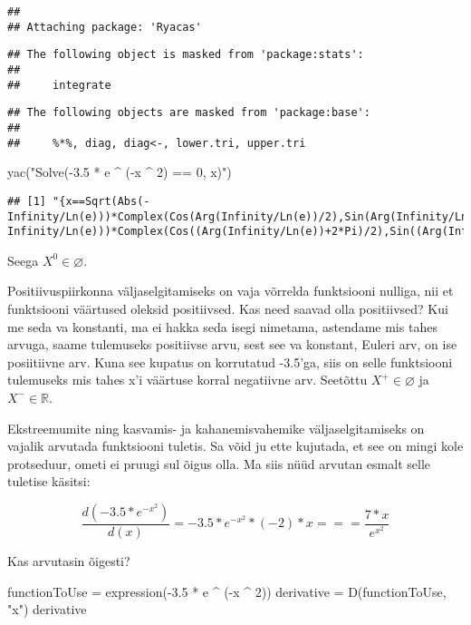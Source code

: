 \documentclass[
]{article}
\newenvironment{Shaded}{\begin{snugshade}}{\end{snugshade}}
\newcommand{\DecValTok}[1]{\textcolor[rgb]{0.00,0.00,0.81}{#1}}
\newcommand{\FloatTok}[1]{\textcolor[rgb]{0.00,0.00,0.81}{#1}}
\newcommand{\FunctionTok}[1]{\textcolor[rgb]{0.00,0.00,0.00}{#1}}
\newcommand{\NormalTok}[1]{#1}
\newcommand{\OtherTok}[1]{\textcolor[rgb]{0.56,0.35,0.01}{#1}}
\newcommand{\SpecialCharTok}[1]{\textcolor[rgb]{0.00,0.00,0.00}{#1}}
\newcommand{\StringTok}[1]{\textcolor[rgb]{0.31,0.60,0.02}{#1}}
\begin{document}
\begin{verbatim}
## 
## Attaching package: 'Ryacas'
\end{verbatim}

\begin{verbatim}
## The following object is masked from 'package:stats':
## 
##     integrate
\end{verbatim}

\begin{verbatim}
## The following objects are masked from 'package:base':
## 
##     %*%, diag, diag<-, lower.tri, upper.tri
\end{verbatim}

\begin{Shaded}
\begin{Highlighting}[]
\FunctionTok{yac}\NormalTok{(}\StringTok{"Solve({-}3.5 * e \^{} ({-}x \^{} 2) == 0, x)"}\NormalTok{)}
\end{Highlighting}
\end{Shaded}

\begin{verbatim}
## [1] "{x==Sqrt(Abs(-Infinity/Ln(e)))*Complex(Cos(Arg(Infinity/Ln(e))/2),Sin(Arg(Infinity/Ln(e))/2)),x==Sqrt(Abs(-Infinity/Ln(e)))*Complex(Cos((Arg(Infinity/Ln(e))+2*Pi)/2),Sin((Arg(Infinity/Ln(e))+2*Pi)/2))}"
\end{verbatim}

Seega \(X ^ 0 \in \varnothing\).

Positiivuspiirkonna väljaselgitamiseks on vaja võrrelda funktsiooni nulliga, nii et funktsiooni väärtused oleksid positiivsed. Kas need saavad olla positiivsed? Kui me seda va konstanti, ma ei hakka seda isegi nimetama, astendame mis tahes arvuga, saame tulemuseks positiivse arvu, sest see va konstant, Euleri arv, on ise posiitiivne arv. Kuna see kupatus on korrutatud -3.5'ga, siis on selle funktsiooni tulemuseks mis tahes x'i väärtuse korral negatiivne arv. Seetõttu \(X ^ + \in \varnothing\) ja \(X ^ - \in \mathbb{R}\).

Ekstreemumite ning kasvamis- ja kahanemisvahemike väljaselgitamiseks on vajalik arvutada funktsiooni tuletis. Sa võid ju ette kujutada, et see on mingi kole protseduur, ometi ei pruugi sul õigus olla. Ma siis nüüd arvutan esmalt selle tuletise käsitsi:

\[\frac{d(-3.5 * e ^ {-x ^ 2})}{d(x)} = -3.5 * e ^ {-x ^ 2} * (-2) * x === \frac{7 * x}{ e ^ {x ^ 2}}\]

Kas arvutasin õigesti?

\begin{Shaded}
\begin{Highlighting}[]
\NormalTok{functionToUse }\OtherTok{=} \FunctionTok{expression}\NormalTok{(}\SpecialCharTok{{-}}\FloatTok{3.5} \SpecialCharTok{*}\NormalTok{ e }\SpecialCharTok{\^{}}\NormalTok{ (}\SpecialCharTok{{-}}\NormalTok{x }\SpecialCharTok{\^{}} \DecValTok{2}\NormalTok{))}
\NormalTok{derivative }\OtherTok{=} \FunctionTok{D}\NormalTok{(functionToUse, }\StringTok{"x"}\NormalTok{)}
\NormalTok{derivative}
\end{Highlighting}
\end{Shaded}
\end{document}
